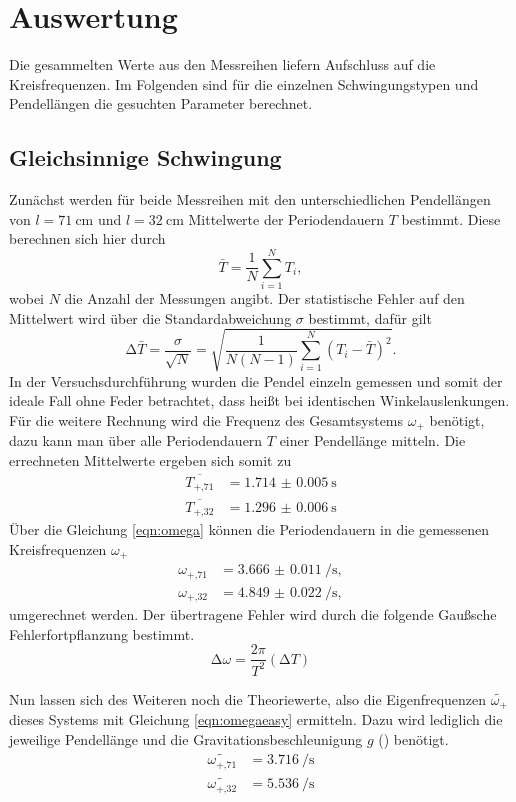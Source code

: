 \section{Auswertung}

Die gesammelten Werte aus den Messreihen liefern Aufschluss auf die Kreisfrequenzen. Im Folgenden sind für die einzelnen Schwingungstypen und Pendellängen die gesuchten Parameter berechnet.

\subsection{Gleichsinnige Schwingung}
Zunächst werden für beide Messreihen mit den unterschiedlichen Pendellängen von $l = \SI{71}{\centi\meter}$ und $l = \SI{32}{\centi\meter}$ Mittelwerte der Periodendauern $T$ bestimmt.
Diese berechnen sich hier durch 
\begin{equation}
\bar{T} = \frac{1}{N} \sum_{i=1}^{N} T_{i},
\end{equation}
wobei $N$ die Anzahl der Messungen angibt. Der statistische Fehler auf den Mittelwert wird über die Standardabweichung $\sigma$ bestimmt, dafür gilt
\begin{equation}
\increment \bar{T} = \frac{\sigma}{\sqrt{N}} = \sqrt{\frac{1}{N(N-1)} \sum_{i=1}^{N} (T_{i} - \bar{T})^{2}}.
\end{equation}
In der Versuchsdurchführung wurden die Pendel einzeln gemessen und somit der ideale Fall ohne Feder betrachtet, dass heißt bei identischen Winkelauslenkungen.
Für die weitere Rechnung wird die Frequenz des Gesamtsystems $\omega_{+}$ benötigt, dazu kann man über alle Periodendauern $T$ einer Pendellänge mitteln.
Die errechneten Mittelwerte ergeben sich somit zu
\begin{align}
    \overline{T_{+\text{,}71}} &= \SI{1.714(5)}{\second} \\
    \overline{T_{+\text{,}32}} &= \SI{1.296(6)}{\second} 
\end{align}
Über die Gleichung \eqref{eqn:omega} können die Periodendauern in die gemessenen Kreisfrequenzen $\omega_{+}$ 
\begin{align}
    \omega_{+\text{,}71} &= \SI{3.666(11)}{\per\second}, \\
    \omega_{+\text{,}32} &= \SI{4.849(22)}{\per\second}, 
\end{align}
umgerechnet werden. Der übertragene Fehler wird durch die folgende Gaußsche Fehlerfortpflanzung bestimmt.
\begin{equation*}
\increment \omega = \frac{2 \pi}{T^2} (\increment T)
\end{equation*}

Nun lassen sich des Weiteren noch die Theoriewerte, also die Eigenfrequenzen $\widetilde{\omega_{+}}$ dieses Systems mit Gleichung \eqref{eqn:omegaeasy} ermitteln. Dazu wird lediglich die jeweilige Pendellänge und die Gravitationsbeschleunigung $g$ (\cite{naturkonstanten}) benötigt.
\begin{align}
    \widetilde{\omega_{+\text{,}71}} &= \SI{3.716}{\per\second} \\
    \widetilde{\omega_{+\text{,}32}} &=  \SI{5.536}{\per\second}
\end{align}